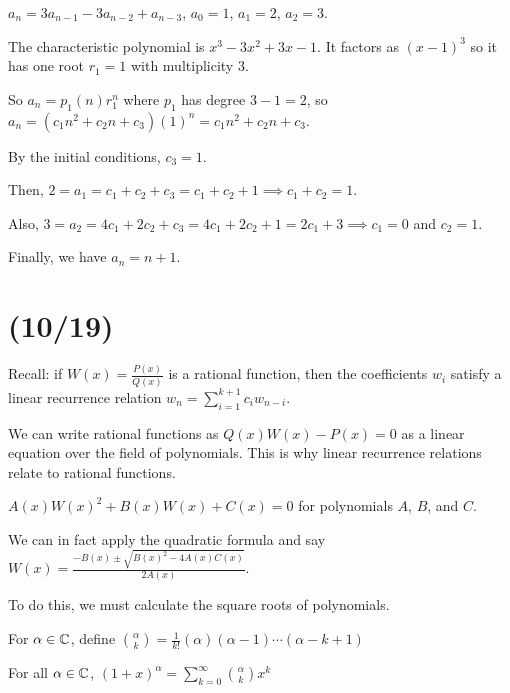 \documentclass[class=math239,notes,tikz]{agony}
\begin{document}
\begin{example}
  $a_n = 3a_{n-1} - 3a_{n-2} + a_{n-3}$, $a_0 = 1$, $a_1 = 2$, $a_2 = 3$.
\end{example}
\begin{sol}
  The characteristic polynomial is $x^3 - 3x^2 + 3x - 1$.
  It factors as $(x-1)^3$ so it has one root $r_1 = 1$ with multiplicity 3.

  So $a_n = p_1(n) r_1^n$ where $p_1$ has degree $3-1=2$,
  so $a_n = (c_1 n^2 + c_2 n + c_3)(1)^n = c_1 n^2 + c_2 n + c_3$.

  By the initial conditions, $c_3 = 1$.

  Then, $2 = a_1 = c_1 + c_2 + c_3 = c_1 + c_2 + 1 \implies c_1 + c_2 = 1$.

  Also, $3 = a_2 = 4c_1 + 2c_2 + c_3 = 4c_1 + 2c_2 + 1 = 2c_1 + 3 \implies c_1 = 0$
  and $c_2 = 1$.

  Finally, we have $a_n = n + 1$.
\end{sol}

\section{(10/19)}

Recall: if $W(x) = \frac{P(x)}{Q(x)}$ is a rational function,
then the coefficients $w_i$ satisfy a linear recurrence relation
$w_n = \sum_{i=1}^{k+1}c_iw_{n-i}$.

We can write rational functions as $Q(x)W(x) - P(x) = 0$
as a linear equation over the field of polynomials.
This is why linear recurrence relations relate to rational functions.

\begin{defn}
  $A(x)W(x)^2 + B(x)W(x) + C(x) = 0$
  for polynomials $A$, $B$, and $C$.
\end{defn}

We can in fact apply the quadratic formula
and say $W(x) = \frac{-B(x)\pm\sqrt{B(x)^2-4A(x)C(x)}}{2A(x)}$.

To do this, we must calculate the square roots of polynomials.

\begin{defn}
  For $\alpha \in \mathbb{C}$, define $\binom{\alpha}{k} = \frac{1}{k!}(\alpha)(\alpha-1)\dotsb(\alpha-k+1)$
\end{defn}

\begin{theorem}\label{thm:genbin}
  For all $\alpha \in \mathbb{C}$,
  $(1+x)^\alpha = \sum\limits_{k=0}^\infty \binom{\alpha}{k}x^k$
\end{theorem}
\end{document}
